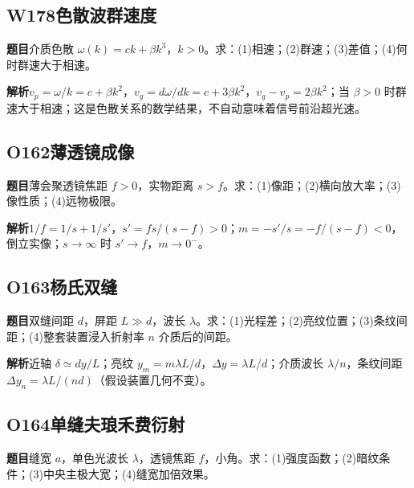 \par\medskip

\subsection*{W178\quad 色散波群速度}

\textbf{题目}\quad 介质色散 $\omega(k)=ck+\beta k^3$，$k>0$。求：(1)相速；(2)群速；(3)差值；(4)何时群速大于相速。

\par\textbf{解析}\quad $v_p=\omega/k=c+\beta k^2$，$v_g=d\omega/dk=c+3\beta k^2$，$v_g-v_p=2\beta k^2$；当 $\beta>0$ 时群速大于相速；这是色散关系的数学结果，不自动意味着信号前沿超光速。

\par\medskip

\subsection*{O162\quad 薄透镜成像}

\textbf{题目}\quad 薄会聚透镜焦距 $f>0$，实物距离 $s>f$。求：(1)像距；(2)横向放大率；(3)像性质；(4)远物极限。

\par\textbf{解析}\quad $1/f=1/s+1/s'$，$s'=fs/(s-f)>0$；$m=-s'/s=-f/(s-f)<0$，倒立实像；$s\to\infty$ 时 $s'\to f$，$m\to0^- $。

\par\medskip

\subsection*{O163\quad 杨氏双缝}

\textbf{题目}\quad 双缝间距 $d$，屏距 $L\gg d$，波长 $\lambda$。求：(1)光程差；(2)亮纹位置；(3)条纹间距；(4)整套装置浸入折射率 $n$ 介质后的间距。

\par\textbf{解析}\quad 近轴 $\delta\simeq dy/L$；亮纹 $y_m=m\lambda L/d$，$\Delta y=\lambda L/d$；介质波长 $\lambda/n$，条纹间距 $\Delta y_n=\lambda L/(nd)$（假设装置几何不变）。

\par\medskip

\subsection*{O164\quad 单缝夫琅禾费衍射}

\textbf{题目}\quad 缝宽 $a$，单色光波长 $\lambda$，透镜焦距 $f$，小角。求：(1)强度函数；(2)暗纹条件；(3)中央主极大宽；(4)缝宽加倍效果。

